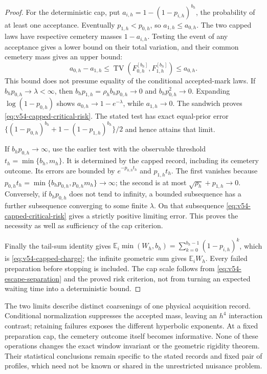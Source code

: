 \begin{proof}
For the deterministic cap, put
$a_{i,h}=1-(1-p_{i,h})^{b_h}$, the probability of at least one acceptance.
Eventually $p_{1,h}<p_{0,h}$, so $a_{1,h}\le a_{0,h}$.
The two capped laws have respective cemetery masses $1-a_{i,h}$.
Testing the event of any acceptance gives a lower bound on their total
variation, and their common cemetery mass gives an upper bound:
\begin{equation}\label{eq:v54-capped-TV-sandwich}
 a_{0,h}-a_{1,h}
  \le \operatorname{TV}(F_{0,h}^{[b_h]},F_{1,h}^{[b_h]})
  \le a_{0,h}.
\end{equation}
This bound does not presume equality of the conditional accepted-mark
laws.  If $b_hp_{0,h}\to\lambda<\infty$, then
$b_hp_{1,h}=\rho_hb_hp_{0,h}\to0$ and
$b_hp_{0,h}^2\to0$.  Expanding $\log(1-p_{0,h})$ shows
$a_{0,h}\to1-e^{-\lambda}$, while $a_{1,h}\to0$.
The sandwich proves \eqref{eq:v54-capped-critical-risk}.  The stated
test has exact equal-prior error
$\{(1-p_{0,h})^{b_h}+1-(1-p_{1,h})^{b_h}\}/2$ and hence attains that
limit.

If $b_hp_{0,h}\to\infty$, use the earlier test with the observable
threshold $t_h=\min\{b_h,m_h\}$.  It is determined by the capped
record, including its cemetery outcome.  Its errors are bounded by
$e^{-p_{0,h}t_h}$ and $p_{1,h}t_h$.  The first vanishes because
$p_{0,h}t_h=\min\{b_hp_{0,h},p_{0,h}m_h\}\to\infty$; the second is
at most $\sqrt{\rho_h}+p_{1,h}\to0$.  Conversely, if
$b_hp_{0,h}$ does not tend to infinity, a bounded subsequence has a
further subsequence converging to some finite $\lambda$.  On that
subsequence \eqref{eq:v54-capped-critical-risk} gives a strictly
positive limiting error.  This proves the necessity as well as
sufficiency of the cap criterion.

Finally the tail-sum identity gives
$\mathbb E_i\min(W_h,b_h)=\sum_{k=0}^{b_h-1}(1-p_{i,h})^k$,
which is \eqref{eq:v54-capped-charge}; the infinite geometric sum gives
$\mathbb E_iW_h$.  Every failed preparation before stopping is included.
The cap scale follows from \eqref{eq:v54-escape-separation} and the
proved risk criterion, not from turning an expected waiting time into
a deterministic bound.
\end{proof}

The two limits describe distinct coarsenings of one physical acquisition
record.  Conditional normalization suppresses the accepted mass, leaving
an $h^4$ interaction contrast; retaining failures exposes the different
hyperbolic exponents.  At a fixed preparation cap, the cemetery outcome
itself becomes informative.  None of these operations changes the exact
window invariant or the geometric rigidity theorem.  Their statistical
conclusions remain specific to the stated records and fixed pair of
profiles, which need not be known or shared in the unrestricted nuisance
problem.
